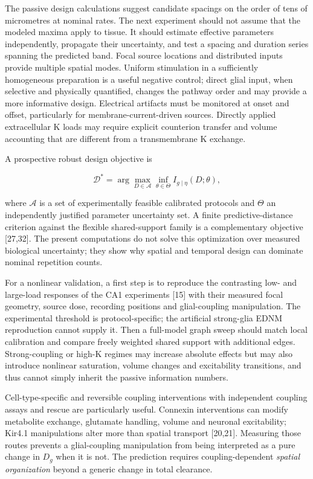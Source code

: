 \documentclass[
  11pt,
]{article}
\begin{document}
The passive design calculations suggest candidate spacings on the order
of tens of micrometres at nominal rates. The next experiment should not
assume that the modeled maxima apply to tissue. It should estimate
effective parameters independently, propagate their uncertainty, and
test a spacing and duration series spanning the predicted band. Focal
source locations and distributed inputs provide multiple spatial modes.
Uniform stimulation in a sufficiently homogeneous preparation is a
useful negative control; direct glial input, when selective and
physically quantified, changes the pathway order and may provide a more
informative design. Electrical artifacts must be monitored at onset and
offset, particularly for membrane-current-driven sources. Directly
applied extracellular K loads may require explicit counterion transfer
and volume accounting that are different from a transmembrane K
exchange.

A prospective robust design objective is

\[\mathcal D^*=\arg\max_{D\in\mathcal A}\inf_{\theta\in\Theta}I_{g\mid\eta}(D;\theta),\]

where \(\mathcal A\) is a set of experimentally feasible calibrated
protocols and \(\Theta\) an independently justified parameter
uncertainty set. A finite predictive-distance criterion against the
flexible shared-support family is a complementary objective {[}27,32{]}.
The present computations do not solve this optimization over measured
biological uncertainty; they show why spatial and temporal design can
dominate nominal repetition counts.

For a nonlinear validation, a first step is to reproduce the contrasting
low- and large-load responses of the CA1 experiments {[}15{]} with their
measured focal geometry, source dose, recording positions and
glial-coupling manipulation. The experimental threshold is
protocol-specific; the artificial strong-glia EDNM reproduction cannot
supply it. Then a full-model graph sweep should match local calibration
and compare freely weighted shared support with additional edges.
Strong-coupling or high-K regimes may increase absolute effects but may
also introduce nonlinear saturation, volume changes and excitability
transitions, and thus cannot simply inherit the passive information
numbers.

Cell-type-specific and reversible coupling interventions with
independent coupling assays and rescue are particularly useful. Connexin
interventions can modify metabolite exchange, glutamate handling, volume
and neuronal excitability; Kir4.1 manipulations alter more than spatial
transport {[}20,21{]}. Measuring those routes prevents a glial-coupling
manipulation from being interpreted as a pure change in \(D_g\) when it
is not. The prediction requires coupling-dependent \emph{spatial
organization} beyond a generic change in total clearance.
\end{document}
